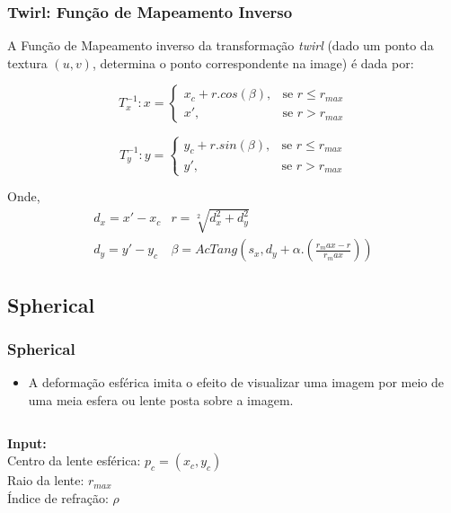\documentclass{beamer}
\begin{document}
\begin{frame}
\frametitle{Twirl: Função de Mapeamento Inverso}
A Função de Mapeamento inverso da transformação \textit{twirl} (dado um ponto da
textura $(u,v)$, determina o ponto correspondente na image) é dada por:

   \begin{equation}
    T_x^{-1}: x = 
\begin{cases}
 x_c + r.cos(\beta), & \text{se } r \leq r_{max}\\
 x', & \text{se } r > r_{max}
\end{cases}
   \end{equation}

\begin{equation}
    T_y^{-1}: y = 
\begin{cases}
 y_c + r.sin(\beta), & \text{se } r \leq r_{max} \\
 y', & \text{se } r > r_{max}
\end{cases}
\end{equation}

Onde,
\begin{equation}
\begin{array}{c|c}
d_x = x'- x_c & r = \sqrt[2]{d_x^2+d_y^2} \\
d_y =  y'- y_c & \beta = AcTang(s_x, d_y + \alpha.(\frac{r_max-r}{r_max}))
\end{array}
\end{equation}
\end{frame}

\subsection{Spherical}
\begin{frame}
 \frametitle{Spherical}
\begin{itemize}
 \item A deformação esférica imita o efeito de visualizar uma imagem por meio
de uma meia esfera ou lente posta sobre a imagem.
\end{itemize}
 
\begin{columns}[c]
\column{1.5in}
\textbf{Input:} \\
Centro da lente esférica: $p_c = (x_c, y_c)$ \\
Raio da lente: $r_{max}$ \\
Índice de refração: $\rho$
\column{1.5in}
\end{columns}
\end{frame}
\end{document}
